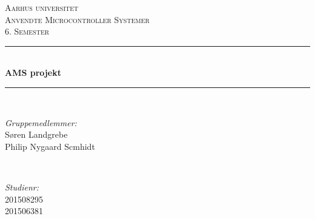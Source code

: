 \documentclass[12pt]{article}
\begin{document}
	
	\begin{titlepage}
		
		
		
		\newcommand{\HRule}{\rule{\linewidth}{0.5mm}} %
		\setlength{\topmargin}{0in}
		\centering %
		
		\textsc{\LARGE Aarhus universitet}\\[1.5cm] %
		\textsc{\Large Anvendte Microcontroller Systemer}\\[0.5cm] %
		\textsc{\large 6. Semester}\\[0.5cm] %
		
		
		\HRule \\[0.4cm]
		{ \huge \bfseries AMS projekt}\\ %
		\HRule \\[1cm]
		
		
		\begin{minipage}{0.4\textwidth}
			\begin{flushleft} \large
				\emph{Gruppemedlemmer:}\\
				Søren Landgrebe \\
				Philip Nygaard Scmhidt \\
			\end{flushleft}
		\end{minipage}
		~
		\begin{minipage}{0.4\textwidth}
			\begin{flushright} \large
				\emph{Studienr:} \\
				201508295\\
				201506381\\
			\end{flushright}
		\end{minipage}\\[5cm]
		

\end{titlepage}
\end{document}
